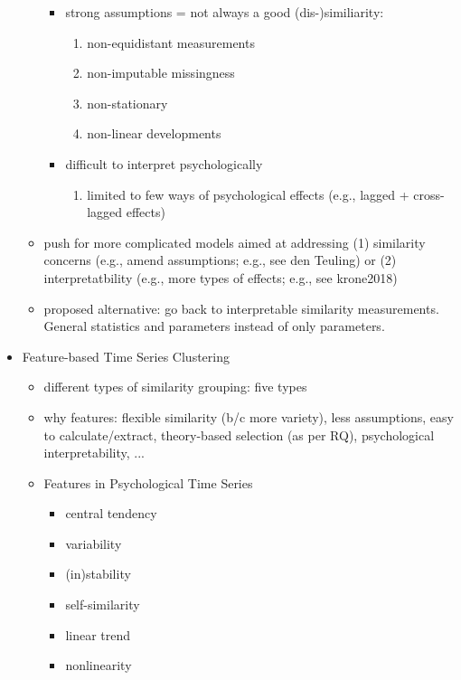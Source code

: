 \documentclass[man, 12pt, a4paper, mask, floatsintext]{apa7}
\theoremstyle{break}
\theoremstyle{plain}
\begin{document}
\begin{mdframed}[style=mdfbox]
\begin{itemize}[nosep]
\begin{itemize}[nosep]
\begin{itemize}[nosep]
            \item strong assumptions = not always a good (dis-)similiarity: 
            \begin{enumerate}[nosep]
                \item non-equidistant measurements
                \item non-imputable missingness
                \item non-stationary
                \item non-linear developments
            \end{enumerate}
            \item difficult to interpret psychologically 
            \begin{enumerate}[nosep]
                \item limited to few ways of psychological effects (e.g., lagged + cross-lagged effects)
            \end{enumerate}
        \end{itemize} 
        \item push for more complicated models aimed at addressing (1) similarity concerns (e.g., amend assumptions; e.g., see den Teuling) or (2) interpretatbility (e.g., more types of effects; e.g., see krone2018)
        \item proposed alternative: go back to interpretable similarity measurements. General statistics and parameters instead of only parameters.
    \end{itemize}
    \item Feature-based Time Series Clustering
    \begin{itemize}[nosep]
        \item different types of similarity grouping: five types
        \item why features: flexible similarity (b/c more variety), less assumptions, easy to calculate/extract, theory-based selection (as per RQ), psychological interpretability, ...
        \item Features in Psychological Time Series
        \begin{itemize}[nosep]
            \item central tendency
            \item variability
            \item (in)stability
            \item self-similarity
            \item linear trend
            \item nonlinearity

\end{itemize}
\end{itemize}
\end{itemize}
\end{mdframed}
\end{document}
